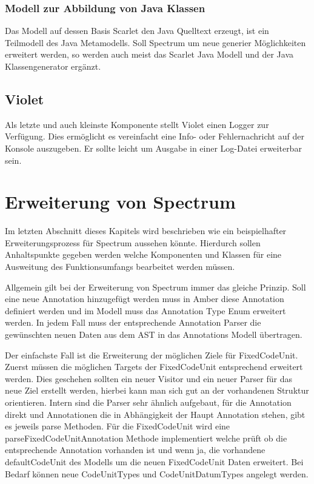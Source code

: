 \documentclass[12pt,oneside,a4paper,parskip]{scrbook}
\begin{document}
\subsubsection{Modell zur Abbildung von Java Klassen}

Das Modell auf dessen Basis Scarlet den Java Quelltext erzeugt, ist ein Teilmodell des Java Metamodells. Soll Spectrum um neue generier Möglichkeiten erweitert werden, so werden auch meist das Scarlet Java Modell und der Java Klassengenerator ergänzt.

\subsection{Violet}

Als letzte und auch kleinste Komponente stellt Violet einen Logger zur Verfügung. Dies ermöglicht es vereinfacht eine Info- oder Fehlernachricht auf der Konsole auszugeben. Er sollte leicht um Ausgabe in einer Log-Datei erweiterbar sein.

\section{Erweiterung von Spectrum}

Im letzten Abschnitt dieses Kapitels wird beschrieben wie ein beispielhafter Erweiterungsprozess für Spectrum aussehen könnte. Hierdurch sollen Anhaltspunkte gegeben werden welche Komponenten und Klassen für eine Ausweitung des Funktionsumfangs bearbeitet werden müssen.

Allgemein gilt bei der Erweiterung von Spectrum immer das gleiche Prinzip. Soll eine neue Annotation hinzugefügt werden muss in Amber diese Annotation definiert werden und im Modell muss das Annotation Type Enum erweitert werden. In jedem Fall muss der entsprechende Annotation Parser die gewünschten neuen Daten aus dem AST in das Annotations Modell übertragen. 

Der einfachste Fall ist die Erweiterung der möglichen Ziele für FixedCodeUnit. Zuerst müssen die möglichen Targets der FixedCodeUnit entsprechend erweitert werden. Dies geschehen sollten ein neuer Visitor und ein neuer Parser für das neue Ziel erstellt werden, hierbei kann man sich gut an der vorhandenen Struktur orientieren. Intern sind die Parser sehr ähnlich aufgebaut, für die Annotation direkt und Annotationen die in Abhängigkeit der Haupt Annotation stehen, gibt es jeweils parse Methoden. Für die FixedCodeUnit wird eine parseFixedCodeUnitAnnotation Methode implementiert welche prüft ob die entsprechende Annotation vorhanden ist und wenn ja, die vorhandene defaultCodeUnit des Modells um die neuen FixedCodeUnit Daten erweitert. Bei Bedarf können neue CodeUnitTypes und CodeUnitDatumTypes angelegt werden. 
\end{document}
